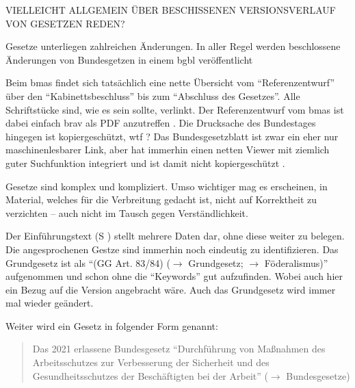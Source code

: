 VIELLEICHT ALLGEMEIN ÜBER BESCHISSENEN VERSIONSVERLAUF VON GESETZEN REDEN?

Gesetze unterliegen zahlreichen Änderungen. In aller Regel werden beschlossene Änderungen von Bundesgetzen in einem \gls{bgbl} veröffentlicht  


Beim \gls{bmas} findet sich tatsächlich eine nette Übersicht vom \enquote{Referenzentwurf} über den \enquote{Kabinettsbeschluss} bis zum \enquote{Abschluss des Gesetzes}.
Alle Schriftstücke sind, wie es sein sollte, verlinkt. Der Referenzentwurf vom \gls{bmas} ist dabei einfach brav als PDF anzutreffen \autocite{BMAS-21.07.2020}. 
Die Drucksache des Bundestages hingegen ist kopiergeschützt, wtf \autocite{Bundestag.31.08.2020}?
Das Bundesgesetzblatt ist zwar ein eher nur maschinenlesbarer Link, aber hat immerhin einen netten Viewer mit ziemlich guter Suchfunktion integriert und ist damit nicht kopiergeschützt \autocite{BGBl.2020-I-Nr67}. 

Gesetze sind komplex und kompliziert. Umso wichtiger mag es erscheinen, in Material, welches für die Verbreitung gedacht ist, nicht auf Korrektheit zu verzichten -- auch nicht im Tausch gegen Verständlichkeit.





Der Einführungstext (\gls{S} \pageref{DEMOKRATIE-A1}) stellt mehrere Daten dar, ohne diese weiter zu belegen.
Die angesprochenen Gestze sind immerhin noch eindeutig zu identifizieren. Das Grundgesetz ist als \enquote{(GG Art. 83/84) ($\rightarrow$ Grundgesetz; $\rightarrow$ Föderalismus)} aufgenommen und schon ohne die \enquote{Keywords} gut aufzufinden. Wobei auch hier ein Bezug auf die Version angebracht wäre. Auch das Grundgesetz wird immer mal wieder geändert.  

Weiter wird ein Gesetz in folgender Form genannt: 
\begin{quote}
    Das 2021 erlassene Bundesgesetz \enquote{Durchführung von Maßnahmen des Arbeitsschutzes zur  Verbesserung der Sicherheit und des Gesundheitsschutzes der Beschäftigten bei der Arbeit} ($\rightarrow$ Bundesgesetze)
\end{quote}

